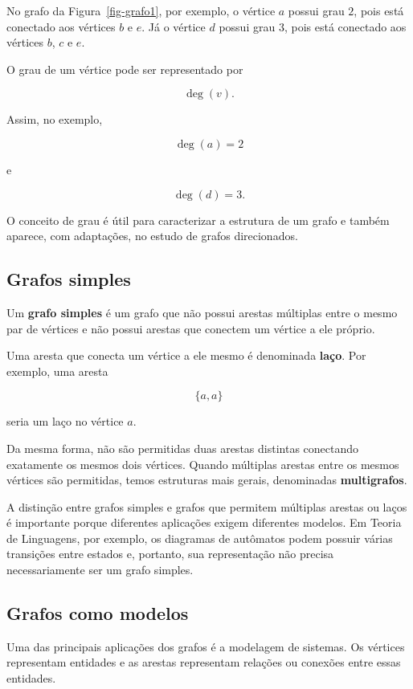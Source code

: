 \documentclass[
  brazilian,
  letterpaper,
]{book}
\theoremstyle{plain}
\theoremstyle{definition}
\theoremstyle{remark}
\begin{document}
No grafo da Figura~\ref{fig-grafo1}, por exemplo, o vértice \(a\) possui
grau \(2\), pois está conectado aos vértices \(b\) e \(e\). Já o vértice
\(d\) possui grau \(3\), pois está conectado aos vértices \(b\), \(c\) e
\(e\).

O grau de um vértice pode ser representado por

\[
\deg(v).
\]

Assim, no exemplo,

\[
\deg(a)=2
\]

e

\[
\deg(d)=3.
\]

O conceito de grau é útil para caracterizar a estrutura de um grafo e
também aparece, com adaptações, no estudo de grafos direcionados.

\subsection{Grafos simples}\label{grafos-simples}

Um \textbf{grafo simples} é um grafo que não possui arestas múltiplas
entre o mesmo par de vértices e não possui arestas que conectem um
vértice a ele próprio.

Uma aresta que conecta um vértice a ele mesmo é denominada
\textbf{laço}. Por exemplo, uma aresta

\[
\{a,a\}
\]

seria um laço no vértice \(a\).

Da mesma forma, não são permitidas duas arestas distintas conectando
exatamente os mesmos dois vértices. Quando múltiplas arestas entre os
mesmos vértices são permitidas, temos estruturas mais gerais,
denominadas \textbf{multigrafos}.

A distinção entre grafos simples e grafos que permitem múltiplas arestas
ou laços é importante porque diferentes aplicações exigem diferentes
modelos. Em Teoria de Linguagens, por exemplo, os diagramas de autômatos
podem possuir várias transições entre estados e, portanto, sua
representação não precisa necessariamente ser um grafo simples.

\subsection{Grafos como modelos}\label{grafos-como-modelos}

Uma das principais aplicações dos grafos é a modelagem de sistemas. Os
vértices representam entidades e as arestas representam relações ou
conexões entre essas entidades.
\end{document}
